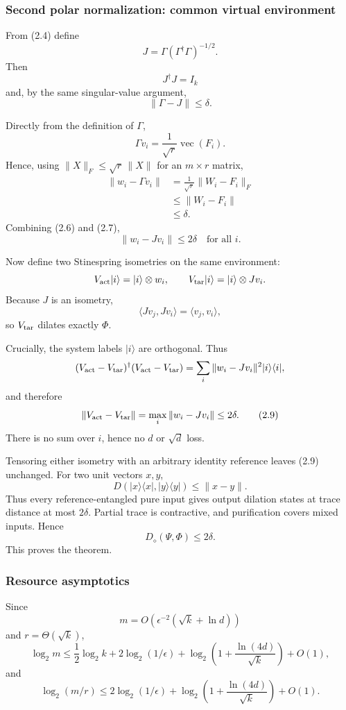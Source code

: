 \documentclass[11pt,a4paper]{article}
\numberwithin{equation}{section}
\begin{document}
\subsubsection{Second polar normalization: common virtual
environment}\label{second-polar-normalization-common-virtual-environment}

From (2.4) define \[
J=\Gamma(\Gamma^\dagger\Gamma)^{-1/2}.
\] Then \[
J^\dagger J=I_k
\] and, by the same singular-value argument, \[
\|\Gamma-J\|\le\delta.
\tag{2.6}
\]

Directly from the definition of \(\Gamma\), \[
\Gamma v_i
=
\frac1{\sqrt r}\operatorname{vec}(F_i).
\] Hence, using \(\|X\|_F\le\sqrt r\,\|X\|\) for an \(m\times r\)
matrix, \[
\begin{aligned}
\|w_i-\Gamma v_i\|
&=
\frac1{\sqrt r}\|W_i-F_i\|_F\\
&\le\|W_i-F_i\|\\
&\le\delta.
\end{aligned}
\tag{2.7}
\] Combining (2.6) and (2.7), \[
\|w_i-Jv_i\|\le2\delta
\quad\text{for all }i.
\tag{2.8}
\]

Now define two Stinespring isometries on the same environment: \[
V_{\rm act}|i\rangle=|i\rangle\otimes w_i,
\qquad
V_{\rm tar}|i\rangle=|i\rangle\otimes Jv_i.
\] Because \(J\) is an isometry, \[
\langle Jv_j,Jv_i\rangle=\langle v_j,v_i\rangle,
\] so \(V_{\rm tar}\) dilates exactly \(\Phi\).

Crucially, the system labels \(|i\rangle\) are orthogonal. Thus \[
(V_{\rm act}-V_{\rm tar})^\dagger
(V_{\rm act}-V_{\rm tar})
=
\sum_i
\|w_i-Jv_i\|^2|i\rangle\langle i|,
\] and therefore \[
\|V_{\rm act}-V_{\rm tar}\|
=
\max_i\|w_i-Jv_i\|
\le2\delta.
\tag{2.9}
\] There is no sum over \(i\), hence no \(d\) or \(\sqrt d\) loss.

Tensoring either isometry with an arbitrary identity reference leaves
(2.9) unchanged. For two unit vectors \(x,y\), \[
D(|x\rangle\langle x|,|y\rangle\langle y|)
\le\|x-y\|.
\] Thus every reference-entangled pure input gives output dilation
states at trace distance at most \(2\delta\). Partial trace is
contractive, and purification covers mixed inputs. Hence \[
D_\diamond(\Psi,\Phi)\le2\delta.
\] This proves the theorem.

\subsubsection{Resource asymptotics}\label{resource-asymptotics}

Since \[
m=O\!\left(
\epsilon^{-2}(\sqrt{k}+\ln d)
\right)
\] and \(r=\Theta(\sqrt{k})\), \[
\log_2m
\le
\frac12\log_2k
+2\log_2(1/\epsilon)
+\log_2\!\left(
1+\frac{\ln(4d)}{\sqrt k}
\right)
+O(1),
\] and \[
\log_2(m/r)
\le
2\log_2(1/\epsilon)
+\log_2\!\left(
1+\frac{\ln(4d)}{\sqrt k}
\right)
+O(1).
\]
\end{document}
